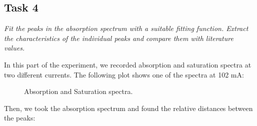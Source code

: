 \documentclass{article}
\begin{document}
\pagebreak{}

\subsection{Task 4}

\textit{Fit the peaks in the absorption spectrum with a suitable ﬁtting function. Extract
the characteristics of the individual peaks and compare them with literature values.}

In this part of the experiment, we recorded absorption and saturation spectra at two different currents. The following plot shows one of the spectra at 102 mA:

\begin{figure}[h]
    \centering
    
    \caption{Absorption and Saturation spectra.}
    \label{fig:absorption_saturation}
\end{figure}

Then, we took the absorption spectrum and found the relative distances between the peaks:
\end{document}
